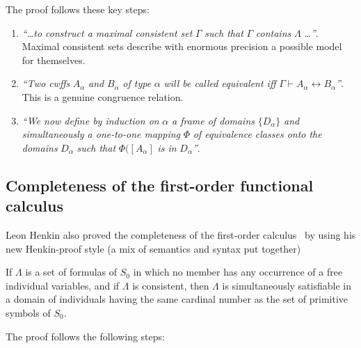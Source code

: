 The proof follows these key steps:

\begin{enumerate}
\item \emph{``\ldots to construct a maximal consistent set} $\Gamma$ 
\emph{such that} $\Gamma$ \emph{contains} $\Lambda$ \emph{\ldots''}. Maximal
consistent sets describe with enormous precision a possible model for
themselves.

\item \emph{``Two cwffs} $A_{\alpha}$ \emph{and} $B_{\alpha}$ 
\emph{of type} $\alpha$ \emph{will be called equivalent iff} $\Gamma
\vdash A_{\alpha }\leftrightarrow B_{\alpha }$\emph{''}. This is a genuine
congruence relation.

\item \emph{``We now define by induction on} $\alpha$ \emph{a 
frame of domains} $\{D_\alpha\}$ \emph{and simultaneously a
one-to-one mapping} $\Phi$ \emph{of equivalence classes onto the domains} $D_{\alpha}$ 
\emph{such that} $\Phi (\left[ A_{\alpha }\right]$
\emph{is in} $D_{\alpha }$\emph{''}.
\end{enumerate}

\subsection{Completeness of the first-order functional calculus}

Leon Henkin also proved the completeness of the first-order 
calculus~\cite{Henkin1949} by using his new Henkin-proof style (a mix of semantics and
syntax put together)

\begin{theorem}
If $\Lambda$  is a set of formulas of 
$S_{0}$  in which no member has any occurrence of a free individual
variables, and if  $\Lambda$  is consistent, then  $\Lambda$
 is simultaneously satisfiable in a domain of individuals having
the same cardinal number as the set of primitive symbols of $S_{0}$.
\end{theorem}

The proof follows the following steps:

